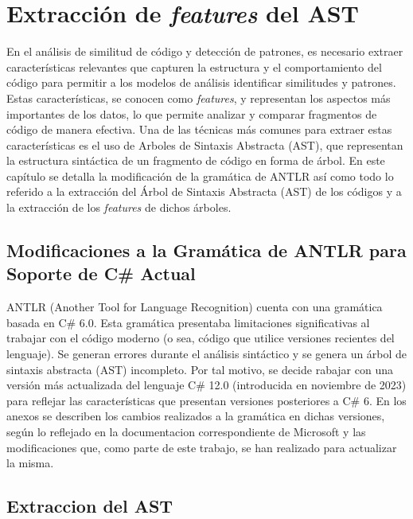 
\chapter{Extracción de \textit{features} del AST}\label{chapter:proposal}

En el análisis de similitud de código y detección de patrones, es necesario extraer características relevantes que capturen la estructura y el comportamiento del código para permitir a los modelos de análisis identificar similitudes y patrones. Estas características, se conocen como \textit{features}, y representan los aspectos más importantes de los datos, lo que permite analizar y comparar fragmentos de código de manera efectiva. Una de las técnicas más comunes para extraer estas características es el uso de Arboles de Sintaxis Abstracta (AST), que representan la estructura sintáctica de un fragmento de código en forma de árbol. En este capítulo se detalla la modificación de la gramática de ANTLR así como todo lo referido a la extracción del Árbol de Sintaxis Abstracta (AST) de los códigos y a la extracción de los \textit{features} de dichos árboles.

\section{Modificaciones a la Gramática de ANTLR para Soporte de C\# Actual}

ANTLR (Another Tool for Language Recognition) cuenta con una gramática basada en C\# 6.0. Esta gramática presentaba limitaciones significativas al trabajar con el código moderno (o sea, código que utilice versiones recientes del lenguaje). Se generan errores durante el análisis sintáctico y se genera un árbol de sintaxis abstracta (AST) incompleto. Por tal motivo, se decide rabajar con una versión más actualizada del lenguaje C\# 12.0 (introducida en noviembre de 2023) para reflejar las características que presentan versiones posteriores a C\# 6.  En los anexos se describen los cambios realizados a la gramática en dichas versiones, según lo reflejado en la documentacion correspondiente de Microsoft \cite{csharp_version_history} y las modificaciones que, como parte de este trabajo, se han realizado para actualizar la misma.\\

\section{Extraccion del AST}

